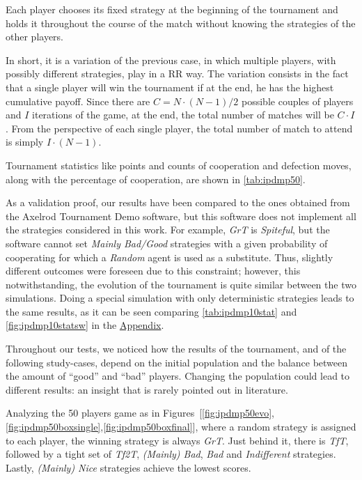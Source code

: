 \documentclass[journal,10pt,twoside]{IEEEtran}
\begin{document}
Each player chooses its fixed strategy at the beginning of the tournament and holds it throughout the course of the match without knowing the strategies of the other players.

In short, it is a variation of the previous case, in which multiple players, with possibly different strategies, play in a RR way. The variation consists in the fact that a single player will win the tournament if at the end, he has the highest cumulative payoff.
Since there are $C=N\cdot (N-1)/2$ possible couples of players and $I$ iterations of the game, at the end, the total number of matches will be $C\cdot I$. From the perspective of each single player, the total number of match to attend is simply $I\cdot(N-1)$.

Tournament statistics like points and counts of cooperation and defection moves, along with the percentage of cooperation, are shown in \autoref{tab:ipdmp50}.

As a validation proof, our results have been compared to the ones obtained from the Axelrod Tournament Demo software, \cite{demosw} but this software does not implement all the strategies considered in this work. For example, \textit{GrT} is \textit{Spiteful}, but the software cannot set \textit{Mainly Bad/Good} strategies with a given probability of cooperating for which a \textit{Random} agent is used as a substitute. Thus, slightly different outcomes were foreseen due to this constraint; however, this notwithstanding, the evolution of the tournament is quite similar between the two simulations.
Doing a special simulation with only deterministic strategies leads to the same results, as it can be seen comparing \autoref{tab:ipdmp10stat} and \autoref{fig:ipdmp10statsw} in the \hyperref[s:appendix]{Appendix}.

Throughout our tests, we noticed how the results of the tournament, and of the following study-cases, depend on the initial population and the balance between the amount of ``good'' and ``bad'' players. Changing the population could lead to different results: an insight that is rarely pointed out in literature.

Analyzing the 50 players game as in Figures~[\ref{fig:ipdmp50evo},\ref{fig:ipdmp50boxsingle},\ref{fig:ipdmp50boxfinal}], where a random strategy is assigned to each player, the winning strategy is always \textit{GrT}. Just behind it, there is \textit{TfT}, followed by a tight set of \textit{Tf2T}, \textit{(Mainly) Bad}, \textit{Bad} and \textit{Indifferent} strategies. Lastly, \textit{(Mainly) Nice} strategies achieve the lowest scores.
\end{document}

